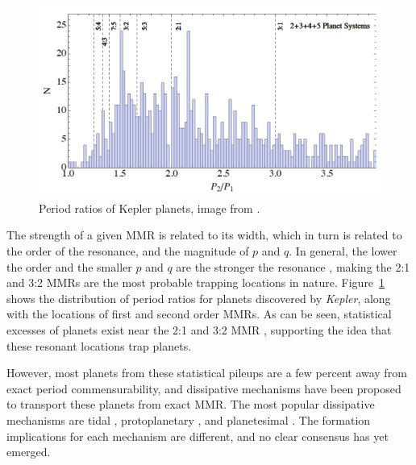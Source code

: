 \documentclass[12pt,letter]{aastex}
\newcommand{\kep}{{\it Kepler}\xspace}
\begin{document}
\begin{figure}
\centering
\includegraphics[width=1.00\textwidth]{Figures/KeplerPeriods.png}
\caption{
\footnotesize Period ratios of Kepler planets, image from \citet{Goldreich2014}.}
\label{fig:KepMMR}
\end{figure}

The strength of a given MMR is related to its width, which in turn is related to the order of the resonance, and the magnitude of $p$ and $q$. 
In general, the lower the order and the smaller $p$ and $q$ are the stronger the resonance \citep{SSD1999}, making the 2:1 and 3:2 MMRs are the most probable trapping locations in nature. 
Figure~\ref{fig:KepMMR} shows the distribution of period ratios for planets discovered by \kep, along with the locations of first and second order MMRs. 
As can be seen, statistical excesses of planets exist near the 2:1 and 3:2 MMR \citep{Lissauer2011,Fabrycky2014,Steffen2015}, supporting the idea that these resonant locations trap planets.

However, most planets from these statistical pileups are a few percent away from exact period commensurability, and dissipative mechanisms have been proposed to transport these planets from exact MMR. 
The most popular dissipative mechanisms are tidal \citep{LithwickWu2012, Batygin2013, Delisle2014}, protoplanetary \citep{Rein2012b, Baruteau2013, Goldreich2014}, and planetesimal \citep{Moore2013, Chatterjee2015}. 
The formation implications for each mechanism are different, and no clear consensus has yet emerged.

\end{document}
